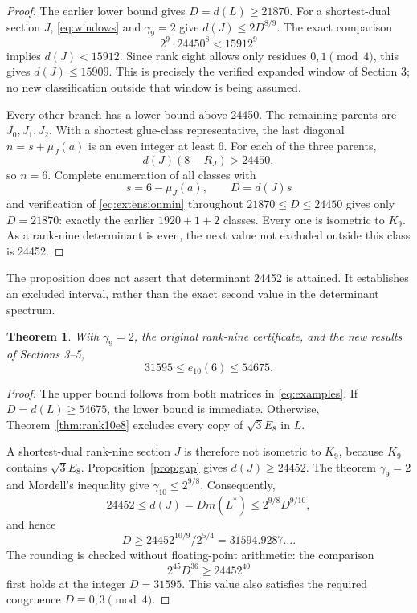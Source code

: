 \documentclass[11pt,a4paper]{article}
\newtheorem{theorem}{Theorem}[section]
\theoremstyle{remark}\newtheorem{remark}[theorem]{Remark}
\begin{document}
\begin{proof}
The earlier lower bound gives $D=d(L)\ge21870$. For a shortest-dual section $J$, \eqref{eq:windows} and $\gamma_9=2$ give $d(J)\le2D^{8/9}$. The exact comparison
\[
2^9\cdot24450^8<15912^9
\]
implies $d(J)<15912$. Since rank eight allows only residues $0,1\pmod4$, this gives $d(J)\le15909$. This is precisely the verified expanded window of Section 3; no new classification outside that window is being assumed.

Every other branch has a lower bound above 24450. The remaining parents are $J_0,J_1,J_2$. With a shortest glue-class representative, the last diagonal $n=s+\mu_J(a)$ is an even integer at least 6. For each of the three parents,
\[
d(J)(8-R_J)>24450,
\]
so $n=6$. Complete enumeration of all classes with
\[
s=6-\mu_J(a),\qquad D=d(J)s
\]
and verification of \eqref{eq:extensionmin} throughout $21870\le D\le24450$ gives only $D=21870$: exactly the earlier $1920+1+2$ classes. Every one is isometric to $K_9$. As a rank-nine determinant is even, the next value not excluded outside this class is 24452.
\end{proof}

The proposition does not assert that determinant 24452 is attained. It establishes an excluded interval, rather than the exact second value in the determinant spectrum.

\begin{theorem}\label{thm:global10}
With $\gamma_9=2$, the original rank-nine certificate, and the new results of Sections 3--5,
\[
\boxed{31595\le e_{10}(6)\le54675}.
\]
\end{theorem}

\begin{proof}
The upper bound follows from both matrices in \eqref{eq:examples}. If $D=d(L)\ge54675$, the lower bound is immediate. Otherwise, Theorem~\ref{thm:rank10e8} excludes every copy of $\sqrt3E_8$ in $L$.

A shortest-dual rank-nine section $J$ is therefore not isometric to $K_9$, because $K_9$ contains $\sqrt3E_8$. Proposition~\ref{prop:gap} gives $d(J)\ge24452$. The theorem $\gamma_9=2$ and Mordell's inequality give $\gamma_{10}\le2^{9/8}$. Consequently,
\[
24452\le d(J)=D m(L^*)\le2^{9/8}D^{9/10},
\]
and hence
\[
D\ge24452^{10/9}/2^{5/4}=31594.9287\ldots.
\]
The rounding is checked without floating-point arithmetic: the comparison
\[
2^{45}D^{36}\ge24452^{40}
\]
first holds at the integer $D=31595$. This value also satisfies the required congruence $D\equiv0,3\pmod4$.
\end{proof}
\end{document}
